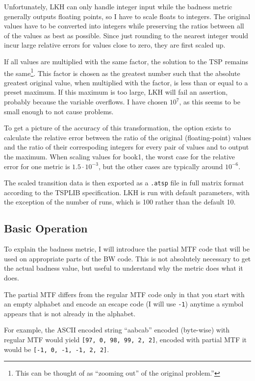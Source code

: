 \documentclass[a4paper]{scrreprt}
\begin{document}
Unfortunately, LKH can only handle integer input while the badness metric
generally outputs floating points, so I have to scale floats to integers. The
original values have to be converted into integers while preserving the ratios
between all of the values as best as possible. Since just rounding to the
nearest integer would incur large relative errors for values close to zero, they
are first scaled up.

If all values are multiplied with the same factor, the solution to the TSP
remains the same\footnote{This can be thought of as ``zooming out'' of the
original problem.''}.
This factor is chosen as the greatest number such that the absolute greatest
original value, when multiplied with the factor, is less than or equal to a
preset maximum. If this maximum is too large, LKH will fail an assertion,
probably because the variable overflows. I have chosen \(10^7\), as this seems
to be small enough to not cause problems.

To get a picture of the accuracy of this transformation, the option exists to
calculate the relative error between the ratio of the original (floating-point)
values and the ratio of their correspoding integers for every pair of values and
to output the maximum. When scaling values for book1, the worst case for the
relative error for one metric is \(1.5 \cdot 10^{-3}\), but the other cases are
typically around \(10^{-6}\).

The scaled transition data is then exported as a \texttt{.atsp} file in full
matrix format according to the TSPLIB specification\cite{reinelt1991tsplib}. LKH
is run with default parameters, with the exception of the number of runs, which
is 100 rather than the default 10.

\subsection{Basic Operation}

To explain the badness metric, I will introduce the partial MTF code that will
be used on appropriate parts of the BW code. This is not absolutely necessary to
get the actual badness value, but useful to understand why the metric does what
it does.

The partial MTF differs from the regular MTF code only in that you start with an
empty alphabet and encode an escape code (I will use \texttt{-1}) anytime a
symbol appears that is not already in the alphabet.

For example, the ASCII encoded string ``aabcab'' encoded (byte-wise) with
regular MTF would yield \texttt{[97, 0, 98, 99, 2, 2]}, encoded with partial MTF
it would be \texttt{[-1, 0, -1, -1, 2, 2]}.
\end{document}
